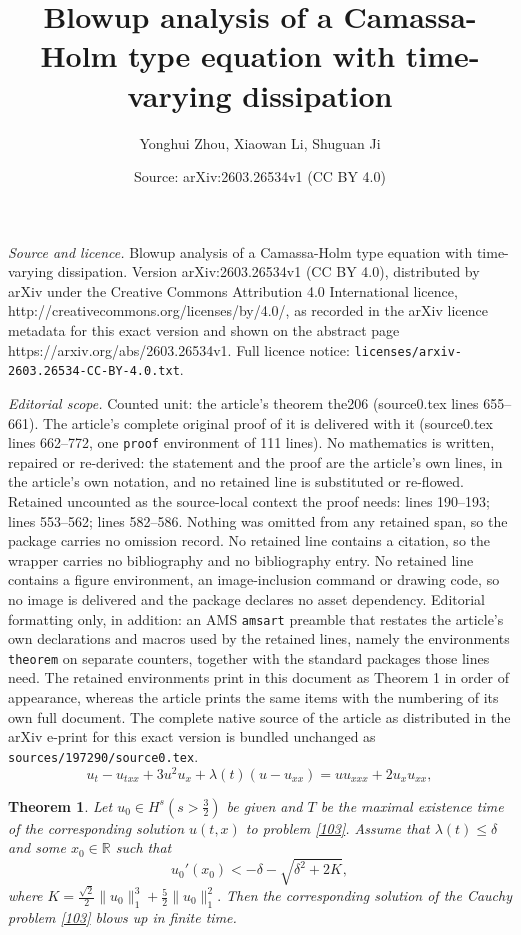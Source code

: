 \documentclass[10pt,a4paper]{amsart}
\title{Blowup analysis of a Camassa-Holm type equation with time-varying dissipation}
\author{Yonghui Zhou, Xiaowan Li, Shuguan Ji}
\date{Source: arXiv:2603.26534v1 (CC BY 4.0)}
\newtheorem{theorem}{Theorem}
\begin{document}
\maketitle

\noindent\emph{Source and licence.} Blowup analysis of a Camassa-Holm type equation with time-varying dissipation. Version arXiv:2603.26534v1 (CC BY 4.0), distributed by arXiv under the Creative Commons Attribution 4.0 International licence, http://creativecommons.org/licenses/by/4.0/, as recorded in the arXiv licence metadata for this exact version and shown on the abstract page https://arxiv.org/abs/2603.26534v1. Full licence notice: \texttt{licenses/arxiv-2603.26534-CC-BY-4.0.txt}.\par\smallskip

\noindent\textit{Editorial scope.} Counted unit: the article's theorem the206 (source0.tex lines 655--661). The article's complete original proof of it is delivered with it (source0.tex lines 662--772, one \texttt{proof} environment of 111 lines). No mathematics is written, repaired or re-derived: the statement and the proof are the article's own lines, in the article's own notation, and no retained line is substituted or re-flowed.  Retained uncounted as the source-local context the proof needs: lines 190--193; lines 553--562; lines 582--586.  Nothing was omitted from any retained span, so the package carries no omission record.  No retained line contains a citation, so the wrapper carries no bibliography and no bibliography entry.  No retained line contains a figure environment, an image-inclusion command or drawing code, so no image is delivered and the package declares no asset dependency.  Editorial formatting only, in addition: an AMS \texttt{amsart} preamble that restates the article's own declarations and macros used by the retained lines, namely the environments \texttt{theorem} on separate counters, together with the standard packages those lines need.  The retained environments print in this document as Theorem 1 in order of appearance, whereas the article prints the same items with the numbering of its own full document.  The complete native source of the article as distributed in the arXiv e-print for this exact version is bundled unchanged as \texttt{sources/197290/source0.tex}.
\begin{equation}
    u_t - u_{txx} + 3u^2 u_x + \lambda(t)(u - u_{xx}) = u u_{xxx} + 2 u_x u_{xx},
    \label{103}
\end{equation}

\begin{theorem}
\label{the205} Let $u_{0}\in H^{s} (s>\frac{3}{2})$ be given and $T$
be the maximal existence time of the corresponding solution $u(t,x)$ to problem \eqref{103}.
Assume that $\lambda(t)\leq \delta$ and some $x_{0}\in \mathbb{R}$ such that
\begin{equation}
u_{0}'(x_{0})<-\delta-\sqrt{\delta^{2}+2K},
\label{2015}
\end{equation}
where $K=\frac{\sqrt{2}}{2}\|u_{0}\|^{3}_{1}+\frac{5}{2}\|u_{0}\|^{2}_{1}.$ Then the corresponding solution of the Cauchy problem \eqref{103} blows up in finite time.
\end{theorem}
\end{document}
